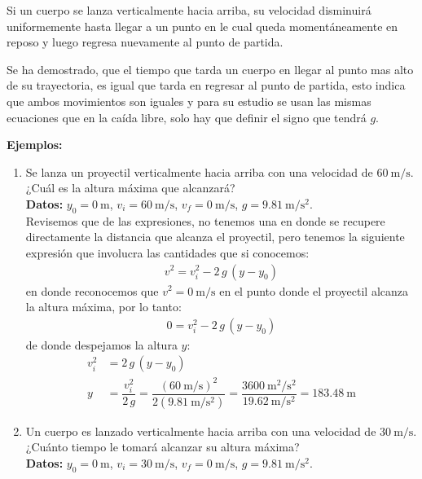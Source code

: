 \documentclass[14pt]{extarticle}
\begin{document}
Si un cuerpo se lanza verticalmente hacia arriba, su velocidad disminuirá uniformemente hasta llegar a un punto en le cual queda momentáneamente en reposo y luego regresa nuevamente al punto de partida.
\par
Se ha demostrado, que el tiempo que tarda un cuerpo en llegar al punto mas alto de su trayectoria, es igual que tarda en regresar al punto de partida, esto indica que ambos movimientos son iguales y para su estudio se usan las mismas ecuaciones que en la caída libre, solo hay que definir el signo que tendrá $g$.

\noindent
\textbf{Ejemplos: }
\begin{enumerate}[label=\roman*)]
\item Se lanza un proyectil verticalmente hacia arriba con una velocidad de $\SI{60}{\meter\per\second}$. ¿Cuál es la altura máxima que alcanzará?
\\[0.5em]
\textbf{Datos:} $y_{0} = \SI{0}{\meter}$, $v_{i} = \SI{60}{\meter\per\second}$, $v_{f} = \SI{0}{\meter\per\second}$, $g = \SI{9.81}{\meter\per\square\second}$.
\\[0.5em]
Revisemos que de las expresiones, no tenemos una en donde se recupere directamente la distancia que alcanza el proyectil, pero tenemos la siguiente expresión que involucra las cantidades que si conocemos:
\begin{align*}
v^{2} = v_{i}^{2} - 2 \, g \, (y - y_{0})
\end{align*}
en donde reconocemos que $v^{2} = \SI{0}{\meter\per\second}$ en el punto donde el proyectil alcanza la altura máxima, por lo tanto:
\begin{align*}
0 = v_{i}^{2} - 2 \, g \, (y - y_{0})
\end{align*}
de donde despejamos la altura $y$:
\begin{align*}
v_{i}^{2} &= 2 \, g \, (y - y_{0}) \\[0.5em]
y &= \dfrac{v_{i}^{2}}{2 \, g} = \dfrac{(\SI{60}{\meter\per\second})^{2}}{2 (\SI{9.81}{\meter\per\square\second})} = \dfrac{\SI{3600}{\square\meter\per\square\second}}{\SI{19.62}{\meter\per\square\second}} = \SI{183.48}{\meter}
\end{align*}
\item Un cuerpo es lanzado verticalmente hacia arriba con una velocidad de $\SI{30}{\meter\per\second}$. ¿Cuánto tiempo le tomará alcanzar su altura máxima?
\\[0.5em]
\textbf{Datos:} $y_{0} = \SI{0}{\meter}$, $v_{i} = \SI{30}{\meter\per\second}$, $v_{f} = \SI{0}{\meter\per\second}$, $g = \SI{9.81}{\meter\per\square\second}$.

\end{enumerate}
\end{document}
